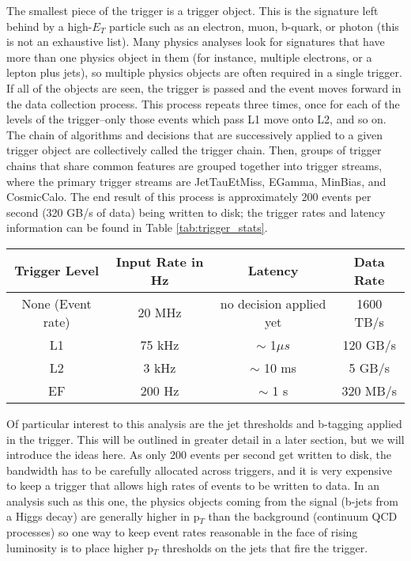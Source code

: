 The smallest piece of the trigger is a trigger object.  This is the signature left behind by a high-$E_T$ particle such as an electron, muon, b-quark, or photon (this is not an exhaustive list).  Many physics analyses look for signatures that have more than one physics object in them (for instance, multiple electrons, or a lepton plus jets), so multiple physics objects are often required in a single trigger.  If all of the objects are seen, the trigger is passed and the event moves forward in the data collection process.  This process repeats three times, once for each of the levels of the trigger--only those events which pass L1 move onto L2, and so on.   The chain of algorithms and decisions that are successively applied to a given trigger object are collectively called the trigger chain.  Then, groups of trigger chains that share common features are grouped together into trigger streams, where the primary trigger streams are JetTauEtMiss, EGamma, MinBias, and CosmicCalo.  The end result of this process is approximately 200 events per second (320 GB/s of data) being written to disk; the trigger rates and latency information can be found in Table \ref{tab:trigger_stats}.

  

\begin{table}
\begin{tabular}{c | c | c | c}
Trigger Level & Input Rate in Hz  & Latency  & Data Rate\\  \hline
None (Event rate) & 20 MHz  & no decision applied yet & 1600 TB/s \\
L1  & 75 kHz  &  $\sim$ 1$\mu s$  & 120 GB/s\\
L2  & 3 kHz    & $\sim$ 10 ms & 5 GB/s \\
EF  &  200 Hz  & $\sim$ 1 s & 320 MB/s \\
\end{tabular}
\end{table}
\label{tab:trigger_stats}


Of particular interest to this analysis are the jet thresholds and b-tagging applied in the trigger.  This will be outlined in greater detail in a later section, but we will introduce the ideas here.  As only 200 events per second get written to disk, the bandwidth has to be carefully allocated across triggers, and it is very expensive to keep a trigger that allows high rates of events to be written to data.  In an analysis such as this one, the physics objects coming from the signal (b-jets from a Higgs decay) are generally higher in p$_T$ than the background (continuum QCD processes) so one way to keep event rates reasonable in the face of rising luminosity is to place higher p$_T$ thresholds on the jets that fire the trigger.   

